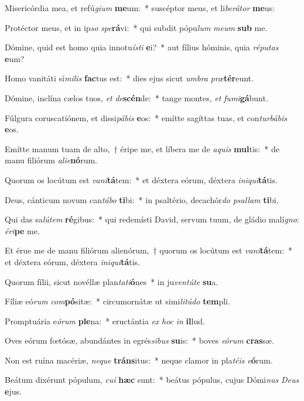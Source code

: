 \item Misericórdia mea, et refú\textit{gi}\textit{um} \textbf{me}um:~* suscéptor meus, et li\textit{be}\textit{rá}\textit{tor} \textbf{me}us:
\item Protéctor meus, et in ip\textit{so} \textit{spe}\textbf{rá}vi:~* qui subdit pópu\textit{lum} \textit{me}\textit{um} \textbf{sub} me.
\item Dómine, quid est homo quia innotu\textit{ís}\textit{ti} \textbf{e}i?~* aut fílius hóminis, quia \textit{ré}\textit{pu}\textit{tas} \textbf{e}um?
\item Homo vanitáti sí\textit{mi}\textit{lis} \textbf{fac}tus est:~* dies ejus sicut \textit{um}\textit{bra} \textit{præ}\textbf{tér}eunt.
\item Dómine, inclína cælos tuos, \textit{et} \textit{de}\textbf{scén}de:~* tange montes, \textit{et} \textit{fu}\textit{mi}\textbf{gá}bunt.
\item Fúlgura coruscatiónem, et dissi\textit{pá}\textit{bis} \textbf{e}os:~* emítte sagíttas tuas, et con\textit{tur}\textit{bá}\textit{bis} \textbf{e}os.
\item Emítte manum tuam de alto,~† éripe me, et líbera me de \textit{a}\textit{quis} \textbf{mul}tis:~* de manu filiórum \textit{a}\textit{li}\textit{e}\textbf{nó}rum.
\item Quorum os locútum est \textit{va}\textit{ni}\textbf{tá}tem:~* et déxtera eórum, déxtera \textit{in}\textit{i}\textit{qui}\textbf{tá}tis.
\item Deus, cánticum novum can\textit{tá}\textit{bo} \textbf{ti}bi:~* in psaltério, decachór\textit{do} \textit{psal}\textit{lam} \textbf{ti}bi.
\item Qui das sa\textit{lú}\textit{tem} \textbf{ré}gibus:~* qui redemísti David, servum tuum, de gládio malí\textit{gno}: \textit{é}\textit{ri}\textbf{pe} me.
\item Et érue me de manu filiórum alienórum,~† quorum os locútum est \textit{va}\textit{ni}\textbf{tá}tem:~* et déxtera eórum, déxtera \textit{in}\textit{i}\textit{qui}\textbf{tá}tis.
\item Quorum fílii, sicut novéllæ plan\textit{ta}\textit{ti}\textbf{ó}nes~* in ju\textit{ven}\textit{tú}\textit{te} \textbf{su}a.
\item Fíliæ eó\textit{rum} \textit{com}\textbf{pó}sitæ:~* circumornátæ ut simi\textit{li}\textit{tú}\textit{do} \textbf{tem}pli.
\item Promptuária e\textit{ó}\textit{rum} \textbf{ple}na:~* eructántia \textit{ex} \textit{hoc} \textit{in} \textbf{il}lud.
\item Oves eórum fœtósæ, abundántes in egrés\textit{si}\textit{bus} \textbf{su}is:~* boves \textit{e}\textit{ó}\textit{rum} \textbf{cras}sæ.
\item Non est ruína macériæ, \textit{ne}\textit{que} \textbf{tráns}itus:~* neque clamor in pla\textit{té}\textit{is} \textit{e}\textbf{ó}rum.
\item Beátum dixérunt pópulum, \textit{cu}\textit{i} \textbf{hæc} sunt:~* beátus pópulus, cujus Dómi\textit{nus} \textit{De}\textit{us} \textbf{e}jus.

